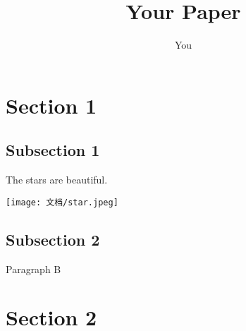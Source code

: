 \documentclass{article}
\title{Your Paper}
\author{You}
\begin{document}
\maketitle

\section{Section 1}

\subsection{Subsection 1}
The stars are beautiful.

\vspace{1cm}
\texttt{[image: 文档/star.jpeg]}

\subsection{Subsection 2}
Paragraph B

\section{Section 2}
\end{document}
